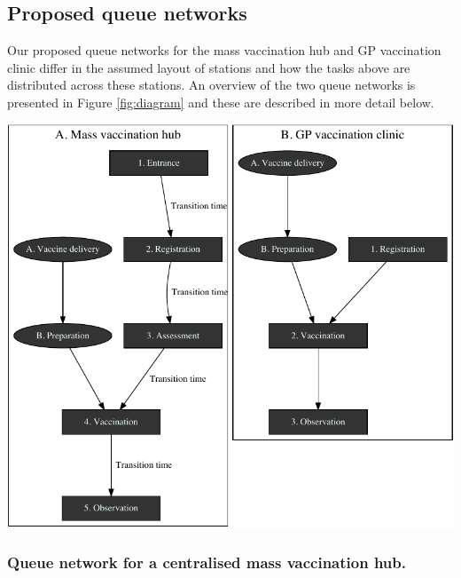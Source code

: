 \documentclass{article}
\let\origfigure\figure
\let\endorigfigure\endfigure
\renewenvironment{figure}[1][2] {
    \expandafter\origfigure\expandafter[H]
} {
    \endorigfigure
}
\begin{document}
\hypertarget{proposed-queue-networks}{%
\subsection{Proposed queue networks}\label{proposed-queue-networks}}

Our proposed queue networks for the mass vaccination hub and GP
vaccination clinic differ in the assumed layout of stations and how the
tasks above are distributed across these stations. An overview of the
two queue networks is presented in Figure \ref{fig:diagram} and these
are described in more detail below.

\begin{figure}

{\centering \includegraphics{Preprint_files/figure-latex/diagram-1} 

}

\caption{Queueing model for arena vaccination site (A) and GP vaccination site (B)}\label{fig:diagram}
\end{figure}

\hypertarget{queue-network-for-a-centralised-mass-vaccination-hub.}{%
\subsubsection{Queue network for a centralised mass vaccination
hub.}\label{queue-network-for-a-centralised-mass-vaccination-hub.}}
\end{document}
